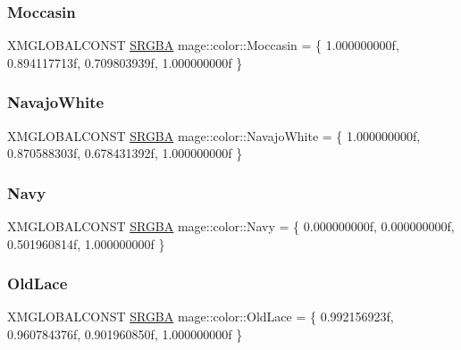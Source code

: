 \hypertarget{namespacemage_1_1color_a096d11ee65ef4509901ddc3b6c14b689}{}\label{namespacemage_1_1color_a096d11ee65ef4509901ddc3b6c14b689} 
\subsubsection{\texorpdfstring{Moccasin}{Moccasin}}
{\footnotesize\ttfamily X\+M\+G\+L\+O\+B\+A\+L\+C\+O\+N\+ST \hyperlink{structmage_1_1_s_r_g_b_a}{S\+R\+G\+BA} mage\+::color\+::\+Moccasin = \{ 1.\+000000000f, 0.\+894117713f, 0.\+709803939f, 1.\+000000000f \}}

\hypertarget{namespacemage_1_1color_a18ab15ea4cd2c7f3da68a72925ec2ad8}{}\label{namespacemage_1_1color_a18ab15ea4cd2c7f3da68a72925ec2ad8} 
\subsubsection{\texorpdfstring{Navajo\+White}{NavajoWhite}}
{\footnotesize\ttfamily X\+M\+G\+L\+O\+B\+A\+L\+C\+O\+N\+ST \hyperlink{structmage_1_1_s_r_g_b_a}{S\+R\+G\+BA} mage\+::color\+::\+Navajo\+White = \{ 1.\+000000000f, 0.\+870588303f, 0.\+678431392f, 1.\+000000000f \}}

\hypertarget{namespacemage_1_1color_a3b7b37c40522972c16f7a929a7d3f82a}{}\label{namespacemage_1_1color_a3b7b37c40522972c16f7a929a7d3f82a} 
\subsubsection{\texorpdfstring{Navy}{Navy}}
{\footnotesize\ttfamily X\+M\+G\+L\+O\+B\+A\+L\+C\+O\+N\+ST \hyperlink{structmage_1_1_s_r_g_b_a}{S\+R\+G\+BA} mage\+::color\+::\+Navy = \{ 0.\+000000000f, 0.\+000000000f, 0.\+501960814f, 1.\+000000000f \}}

\hypertarget{namespacemage_1_1color_a4585d8de34bbb038d7f5508fa7116713}{}\label{namespacemage_1_1color_a4585d8de34bbb038d7f5508fa7116713} 
\subsubsection{\texorpdfstring{Old\+Lace}{OldLace}}
{\footnotesize\ttfamily X\+M\+G\+L\+O\+B\+A\+L\+C\+O\+N\+ST \hyperlink{structmage_1_1_s_r_g_b_a}{S\+R\+G\+BA} mage\+::color\+::\+Old\+Lace = \{ 0.\+992156923f, 0.\+960784376f, 0.\+901960850f, 1.\+000000000f \}}

